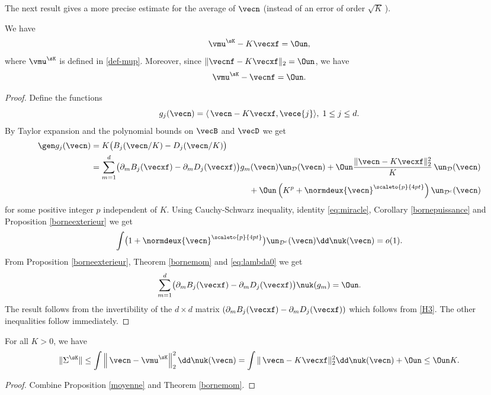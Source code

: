 The next result gives a more precise estimate for the average of $\vecn$ (instead of an error of order $\sqrt{K}\,$).
\begin{proposition}\label{moyenne}
We have
\[
\vmu^{\sK}-K\vecxf =\Oun,
\]
where $\vmu^{\sK}$ is defined in \eqref{def-mup}.
Moreover, since $\|\vecnf-K\vecxf \|_{2}=\Oun$, we have
\begin{equation}\label{nfvsxf}
\vmu^{\sK}-\vecnf=\Oun.
\end{equation}
\end{proposition}
\begin{proof}
Define the functions
\[
g_{j}(\vecn)=\langle\, \vecn-K \vecxf,\vece{j}\rangle,\; 1\le j\le d.
\]
By Taylor expansion and the polynomial bounds on $\vecB$ and $\vecD$ we get
\begin{align*}
\gen g_{j}(\vecn)&=K\bigl(B_{j}(\vecn/K)- D_{j}(\vecn/K)\bigr)\\
& =\sum_{m=1}^d \bigl(\partial_{m} B_{j}(\vecxf)-\partial_{m}
D_{j}(\vecxf)\bigr) g_{m}(\vecn)\un_{\mathcal{D}}(\vecn)+\Oun
\frac{\|\vecn-K\vecxf \|_{2}^2}{K}\, \un_{\mathcal{D}}(\vecn)\\
& \hspace*{6.72cm} + \Oun\left(K^{p}+\normdeux{\vecn}^{\scaleto{p}{4pt}}\right)\un_{\mathcal{D}^{c}}(\vecn)
\end{align*}
for some positive integer $p$ independent of $K$.
Using Cauchy-Schwarz inequality, identity \eqref{eq:miracle}, Corollary \ref{bornepuissance} and Proposition \ref{borneexterieur}
we get
\[
\int \bigl(1+\normdeux{\vecn}^{\scaleto{p}{4pt}}\bigr)\un_{\mathcal{D}^{c}}(\vecn)\dd\nuk(\vecn)=o(1).
\]
From Proposition \ref{borneexterieur}, Theorem \ref{bornemom} and \eqref{eq:lambda0} we get
\[
\sum_{m=1}^d \bigl(\partial_{m} B_{j}(\vecxf)-\partial_{m}
D_{j}(\vecxf)\bigr)\nuk(g_{m})=\Oun.
\]
The result follows from the invertibility of the $d\times d$ matrix
$(\partial_{m} B_{j}(\vecxf)-\partial_{m}D_{j}(\vecxf))$ which follows
from \eqref{H3}. The other inequalities follow immediately.
\end{proof}

\begin{corollary}\label{variance}
For all $K>0$, we have
\[
\|\Sigma^{\sK}\|\leq \int \left\|\,\vecn-\vmu^{\sK}\right\|_{2}^2 \dd \nuk(\vecn)=
\int \|\,\vecn-K\vecxf \|_{2}^2\dd\nuk(\vecn)+\Oun
\leq \Oun K.
\]
\end{corollary}
\begin{proof}
Combine Proposition \ref{moyenne} and Theorem \ref{bornemom}.
\end{proof}

